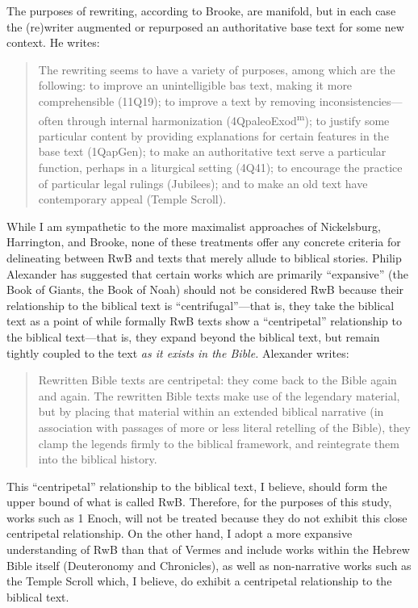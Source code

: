 The purposes of rewriting, according to Brooke, are manifold, but in
each case the (re)writer augmented or repurposed an authoritative base
text for some new context. He writes:

\begin{quote}
The rewriting seems to have a variety of purposes, among which are the
following: to improve an unintelligible bas text, making it more
comprehensible (11Q19); to improve a text by removing
inconsistencies---often through internal harmonization
(4QpaleoExod\textsuperscript{m}); to justify some particular content by
providing explanations for certain features in the base text (1QapGen);
to make an authoritative text serve a particular function, perhaps in a
liturgical setting (4Q41); to encourage the practice of particular legal
rulings (Jubilees); and to make an old text have contemporary appeal
(Temple Scroll).\autocite[778]{brooke_schiffman-vanderkam2000}
\end{quote}

While I am sympathetic to the more maximalist approaches of Nickelsburg,
Harrington, and Brooke, none of these treatments offer any concrete
criteria for delineating between RwB and texts that merely allude to
biblical stories. Philip Alexander has suggested that certain works
which are primarily ``expansive'' (the Book of Giants, the Book of Noah)
should not be considered RwB because their relationship to the biblical
text is ``centrifugal''---that is, they take the biblical text as a
point of while formally RwB texts show a ``centripetal'' relationship to
the biblical text---that is, they expand beyond the biblical text, but
remain tightly coupled to the text \emph{as it exists in the Bible.}
Alexander writes:

\begin{quote}
Rewritten Bible texts are centripetal: they come back to the Bible again
and again. The rewritten Bible texts make use of the legendary material,
but by placing that material within an extended biblical narrative (in
association with passages of more or less literal retelling of the
Bible), they clamp the legends firmly to the biblical framework, and
reintegrate them into the biblical history.
\autocite[117]{alexander_carson-williamson1988}
\end{quote}

This ``centripetal'' relationship to the biblical text, I believe,
should form the upper bound of what is called RwB. Therefore, for the
purposes of this study, works such as 1 Enoch, will not be treated
because they do not exhibit this close centripetal relationship. On the
other hand, I adopt a more expansive understanding of RwB than that of
Vermes and include works within the Hebrew Bible itself (Deuteronomy and
Chronicles), as well as non-narrative works such as the Temple Scroll
which, I believe, do exhibit a centripetal relationship to the biblical
text.

